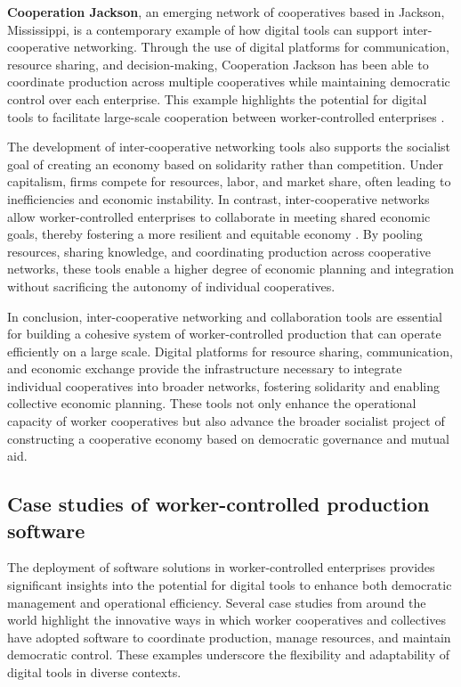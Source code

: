 \begin{refsection}
\textbf{Cooperation Jackson}, an emerging network of cooperatives based in Jackson, Mississippi, is a contemporary example of how digital tools can support inter-cooperative networking. Through the use of digital platforms for communication, resource sharing, and decision-making, Cooperation Jackson has been able to coordinate production across multiple cooperatives while maintaining democratic control over each enterprise. This example highlights the potential for digital tools to facilitate large-scale cooperation between worker-controlled enterprises \cite[pp.~113-117]{akuno2017}.

The development of inter-cooperative networking tools also supports the socialist goal of creating an economy based on solidarity rather than competition. Under capitalism, firms compete for resources, labor, and market share, often leading to inefficiencies and economic instability. In contrast, inter-cooperative networks allow worker-controlled enterprises to collaborate in meeting shared economic goals, thereby fostering a more resilient and equitable economy \cite[pp.~112-115]{schweickart2011}. By pooling resources, sharing knowledge, and coordinating production across cooperative networks, these tools enable a higher degree of economic planning and integration without sacrificing the autonomy of individual cooperatives.

In conclusion, inter-cooperative networking and collaboration tools are essential for building a cohesive system of worker-controlled production that can operate efficiently on a large scale. Digital platforms for resource sharing, communication, and economic exchange provide the infrastructure necessary to integrate individual cooperatives into broader networks, fostering solidarity and enabling collective economic planning. These tools not only enhance the operational capacity of worker cooperatives but also advance the broader socialist project of constructing a cooperative economy based on democratic governance and mutual aid.

\subsection{Case studies of worker-controlled production software}

The deployment of software solutions in worker-controlled enterprises provides significant insights into the potential for digital tools to enhance both democratic management and operational efficiency. Several case studies from around the world highlight the innovative ways in which worker cooperatives and collectives have adopted software to coordinate production, manage resources, and maintain democratic control. These examples underscore the flexibility and adaptability of digital tools in diverse contexts.


\end{refsection}
